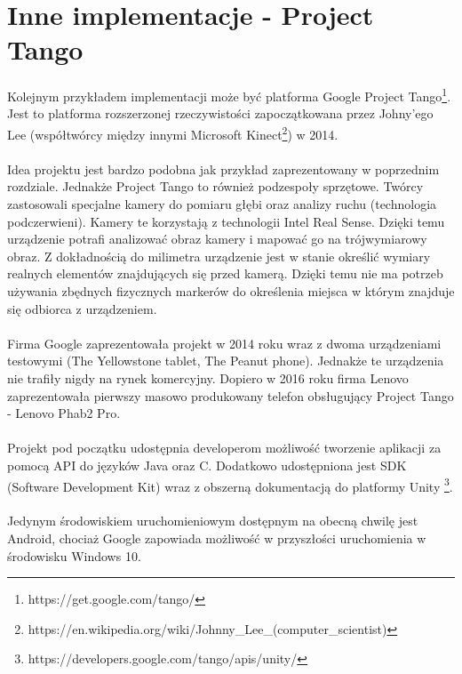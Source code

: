 \newpage
\section{Inne implementacje - Project Tango}
\paragraph{}
Kolejnym przykładem implementacji może być platforma Google Project Tango\footnote{https://get.google.com/tango/}. Jest to platforma rozszerzonej rzeczywistości zapoczątkowana przez Johny'ego Lee (współtwórcy między innymi Microsoft Kinect\footnote{https://en.wikipedia.org/wiki/Johnny\_Lee\_(computer\_scientist)}) w 2014. 
\paragraph{}
Idea projektu jest bardzo podobna jak przykład zaprezentowany w poprzednim rozdziale. Jednakże Project Tango to również podzespoły sprzętowe. Twórcy zastosowali specjalne kamery do pomiaru głębi oraz analizy ruchu (technologia podczerwieni). Kamery te korzystają z technologii Intel Real Sense. Dzięki temu urządzenie potrafi analizować obraz kamery i mapować go na trójwymiarowy obraz. Z dokładnością do milimetra urządzenie jest w stanie określić wymiary realnych elementów znajdujących się przed kamerą. Dzięki temu nie ma potrzeb używania zbędnych fizycznych markerów do określenia miejsca w którym znajduje się odbiorca z urządzeniem.
\paragraph{}
Firma Google zaprezentowała projekt w 2014 roku wraz z dwoma urządzeniami testowymi (The Yellowstone tablet,  The Peanut phone). Jednakże te urządzenia nie trafiły nigdy na rynek komercyjny. Dopiero w 2016 roku firma Lenovo zaprezentowała pierwszy masowo produkowany telefon obsługujący Project Tango - Lenovo Phab2 Pro.
\paragraph{}
Projekt pod początku udostępnia developerom możliwość tworzenie aplikacji za pomocą API do języków Java oraz C. Dodatkowo udostępniona jest SDK (Software Development Kit) wraz z obszerną dokumentacją do platformy Unity \footnote{https://developers.google.com/tango/apis/unity/}.
\paragraph{}
Jedynym środowiskiem uruchomieniowym dostępnym na obecną chwilę jest Android, chociaż Google zapowiada możliwość w przyszłości uruchomienia w środowisku Windows 10.

